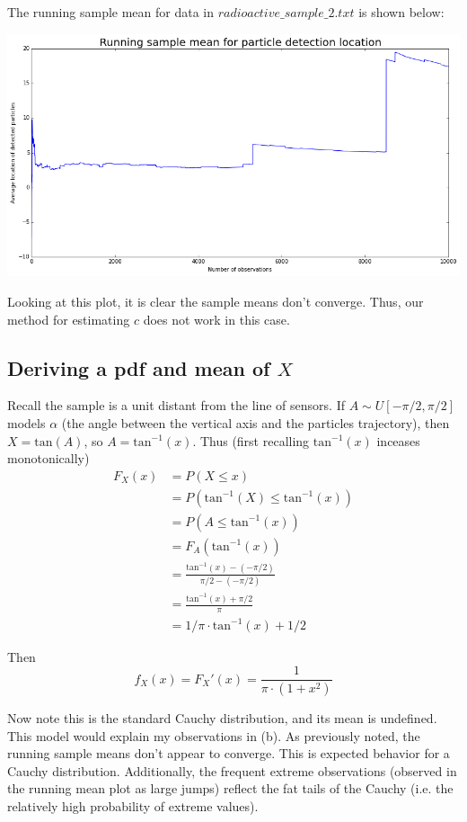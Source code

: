 \documentclass[paper=a4, fontsize=11pt]{scrartcl} %
\numberwithin{equation}{section} %
\numberwithin{figure}{section} %
\numberwithin{table}{section} %
\begin{document}
The running sample mean for data in $radioactive\_sample\_2.txt$ is shown below:

\includegraphics[scale=0.5]{Q4b_fig}

Looking at this plot, it is clear the sample means don't converge. Thus, our method for estimating $c$ does not work in this case.

\subsection{Deriving a pdf and mean of $X$}

Recall the sample is a unit distant from the line of sensors. If $A \sim U[-\pi /2, \pi /2]$ models $\alpha$ (the angle between the vertical axis and the particles trajectory), then $X = \textrm{tan}(A)$, so $A = \textrm{tan}^{-1}(x)$. Thus (first recalling $\textrm{tan}^{-1}(x)$ inceases monotonically)
\begin{align*}
F_X(x) &= P(X \leq x) \\
   &= P(\textrm{tan}^{-1}(X) \leq \textrm{tan}^{-1}(x)) \\ 
   &= P(A \leq \textrm{tan}^{-1}(x)) \\ 
   &= F_A(\textrm{tan}^{-1}(x)) \\ 
   &= \frac{\textrm{tan}^{-1}(x) - (-\pi/2)}{\pi/2 - (-\pi/2)} \\ 
   &= \frac{\textrm{tan}^{-1}(x) + \pi/2}{\pi} \\ 
   &= 1/\pi \cdot \textrm{tan}^{-1}(x) + 1/2
\end{align*} 

Then
\[f_X(x) = F_X'(x) = \frac{1}{\pi \cdot (1 + x^2)}\]

Now note this is the standard Cauchy distribution, and its mean is undefined. This model would explain my observations in (b). As previously noted, the running sample means don't appear to converge. This is expected behavior for a Cauchy distribution. Additionally, the frequent extreme observations (observed in the running mean plot as large jumps) reflect the fat tails of the Cauchy (i.e. the relatively high probability of extreme values).
\end{document}
